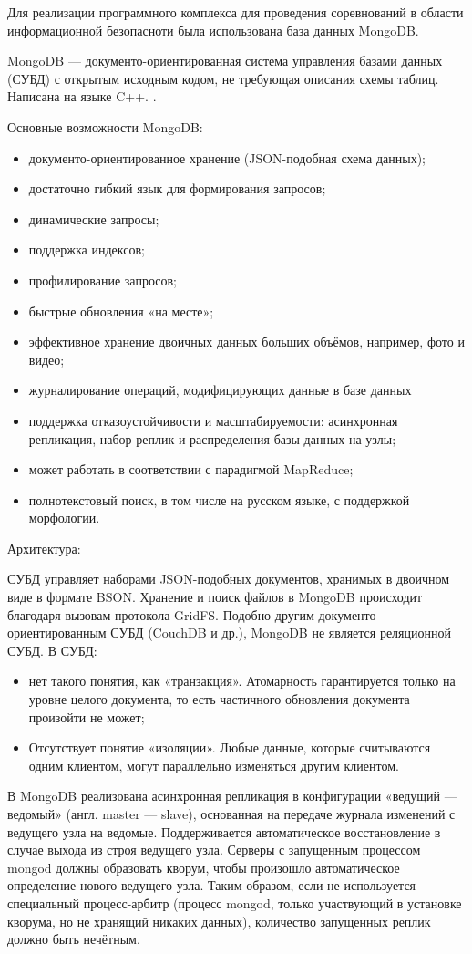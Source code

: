 Для реализации программного комплекса для проведения соревнований в области информационной безопасноти была использована база данных MongoDB.

MongoDB --- документо-ориентированная система управления базами данных (СУБД) с открытым исходным кодом, не требующая описания схемы таблиц. Написана на языке C++. \cite{mongo}.

Основные возможности MongoDB:
\begin{itemize}
\item документо-ориентированное хранение (JSON-подобная схема данных);
\item достаточно гибкий язык для формирования запросов;
\item динамические запросы;
\item поддержка индексов;
\item профилирование запросов;
\item быстрые обновления «на месте»;
\item эффективное хранение двоичных данных больших объёмов, например, фото и видео;
\item журналирование операций, модифицирующих данные в базе данных
\item поддержка отказоустойчивости и масштабируемости: асинхронная репликация, набор реплик и распределения базы данных на узлы;
\item может работать в соответствии с парадигмой MapReduce;
\item полнотекстовый поиск, в том числе на русском языке, с поддержкой морфологии.
\end{itemize}

Архитектура:

СУБД управляет наборами JSON-подобных документов, хранимых в двоичном виде в формате BSON. Хранение и поиск файлов в MongoDB происходит благодаря вызовам протокола GridFS. Подобно другим документо-ориентированным СУБД (CouchDB и др.), MongoDB не является реляционной СУБД. В СУБД:

\begin{itemize}
\item нет такого понятия, как «транзакция». Атомарность гарантируется только на уровне целого документа, то есть частичного обновления документа произойти не может;
\item Отсутствует понятие «изоляции». Любые данные, которые считываются одним клиентом, могут параллельно изменяться другим клиентом.
\end{itemize}

В MongoDB реализована асинхронная репликация в конфигурации «ведущий — ведомый» (англ. master — slave), основанная на передаче журнала изменений с ведущего узла на ведомые. Поддерживается автоматическое восстановление в случае выхода из строя ведущего узла. Серверы с запущенным процессом mongod должны образовать кворум, чтобы произошло автоматическое определение нового ведущего узла. Таким образом, если не используется специальный процесс-арбитр (процесс mongod, только участвующий в установке кворума, но не хранящий никаких данных), количество запущенных реплик должно быть нечётным.
